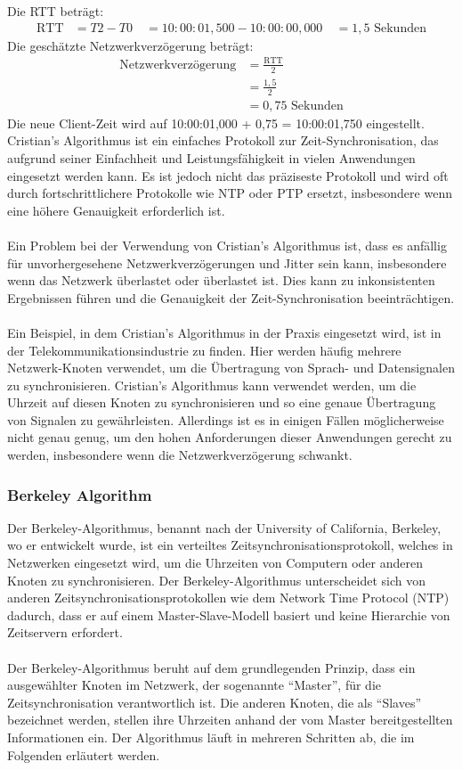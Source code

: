 Die RTT beträgt:
\begin{align*}
\text{RTT} &= T2 - T0 \
&= 10:00:01,500 - 10:00:00,000 \
&= 1,5\text{ Sekunden}
\end{align*}
Die geschätzte Netzwerkverzögerung beträgt:
\begin{align*}
\text{Netzwerkverzögerung} &= \frac{\text{RTT}}{2} \\
&= \frac{1,5}{2} \\
&= 0,75\text{ Sekunden}
\end{align*}
Die neue Client-Zeit wird auf 10:00:01,000 + 0,75 = 10:00:01,750 eingestellt.
Cristian's Algorithmus ist ein einfaches Protokoll zur Zeit-Synchronisation, das aufgrund seiner Einfachheit und Leistungsfähigkeit in vielen Anwendungen eingesetzt werden kann. Es ist jedoch nicht das präziseste Protokoll und wird oft durch fortschrittlichere Protokolle wie NTP oder PTP ersetzt, insbesondere wenn eine höhere Genauigkeit erforderlich ist.
\\\\
Ein Problem bei der Verwendung von Cristian's Algorithmus ist, dass es anfällig für unvorhergesehene Netzwerkverzögerungen und Jitter sein kann, insbesondere wenn das Netzwerk überlastet oder überlastet ist. Dies kann zu inkonsistenten Ergebnissen führen und die Genauigkeit der Zeit-Synchronisation beeinträchtigen.
\\\\
Ein Beispiel, in dem Cristian's Algorithmus in der Praxis eingesetzt wird, ist in der Telekommunikationsindustrie zu finden. Hier werden häufig mehrere Netzwerk-Knoten verwendet, um die Übertragung von Sprach- und Datensignalen zu synchronisieren. Cristian's Algorithmus kann verwendet werden, um die Uhrzeit auf diesen Knoten zu synchronisieren und so eine genaue Übertragung von Signalen zu gewährleisten. Allerdings ist es in einigen Fällen möglicherweise nicht genau genug, um den hohen Anforderungen dieser Anwendungen gerecht zu werden, insbesondere wenn die Netzwerkverzögerung schwankt.

\subsubsection{Berkeley Algorithm}

Der Berkeley-Algorithmus, benannt nach der University of California, Berkeley, wo er entwickelt wurde, ist ein verteiltes Zeitsynchronisationsprotokoll, welches in Netzwerken eingesetzt wird, um die Uhrzeiten von Computern oder anderen Knoten zu synchronisieren.  Der Berkeley-Algorithmus unterscheidet sich von anderen Zeitsynchronisationsprotokollen wie dem Network Time Protocol (NTP) dadurch, dass er auf einem Master-Slave-Modell basiert und keine Hierarchie von Zeitservern erfordert.
\\\\
Der Berkeley-Algorithmus beruht auf dem grundlegenden Prinzip, dass ein ausgewählter Knoten im Netzwerk, der sogenannte \enquote{Master}, für die Zeitsynchronisation verantwortlich ist. Die anderen Knoten, die als \enquote{Slaves} bezeichnet werden, stellen ihre Uhrzeiten anhand der vom Master bereitgestellten Informationen ein. Der Algorithmus läuft in mehreren Schritten ab, die im Folgenden erläutert werden.

